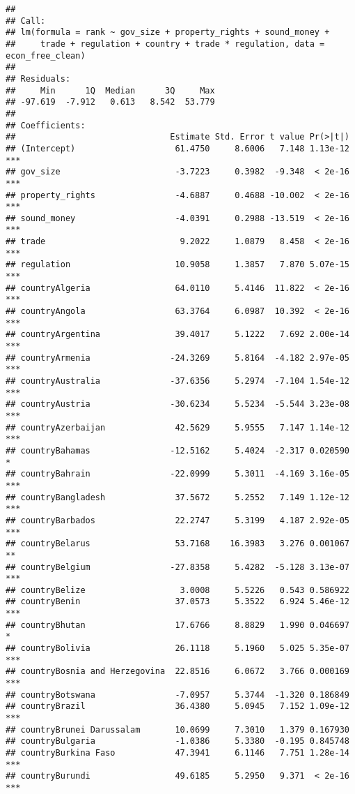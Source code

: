 \documentclass[
  11pt,
]{article}
\begin{document}
\begin{verbatim}
## 
## Call:
## lm(formula = rank ~ gov_size + property_rights + sound_money + 
##     trade + regulation + country + trade * regulation, data = econ_free_clean)
## 
## Residuals:
##     Min      1Q  Median      3Q     Max 
## -97.619  -7.912   0.613   8.542  53.779 
## 
## Coefficients:
##                               Estimate Std. Error t value Pr(>|t|)    
## (Intercept)                    61.4750     8.6006   7.148 1.13e-12 ***
## gov_size                       -3.7223     0.3982  -9.348  < 2e-16 ***
## property_rights                -4.6887     0.4688 -10.002  < 2e-16 ***
## sound_money                    -4.0391     0.2988 -13.519  < 2e-16 ***
## trade                           9.2022     1.0879   8.458  < 2e-16 ***
## regulation                     10.9058     1.3857   7.870 5.07e-15 ***
## countryAlgeria                 64.0110     5.4146  11.822  < 2e-16 ***
## countryAngola                  63.3764     6.0987  10.392  < 2e-16 ***
## countryArgentina               39.4017     5.1222   7.692 2.00e-14 ***
## countryArmenia                -24.3269     5.8164  -4.182 2.97e-05 ***
## countryAustralia              -37.6356     5.2974  -7.104 1.54e-12 ***
## countryAustria                -30.6234     5.5234  -5.544 3.23e-08 ***
## countryAzerbaijan              42.5629     5.9555   7.147 1.14e-12 ***
## countryBahamas                -12.5162     5.4024  -2.317 0.020590 *  
## countryBahrain                -22.0999     5.3011  -4.169 3.16e-05 ***
## countryBangladesh              37.5672     5.2552   7.149 1.12e-12 ***
## countryBarbados                22.2747     5.3199   4.187 2.92e-05 ***
## countryBelarus                 53.7168    16.3983   3.276 0.001067 ** 
## countryBelgium                -27.8358     5.4282  -5.128 3.13e-07 ***
## countryBelize                   3.0008     5.5226   0.543 0.586922    
## countryBenin                   37.0573     5.3522   6.924 5.46e-12 ***
## countryBhutan                  17.6766     8.8829   1.990 0.046697 *  
## countryBolivia                 26.1118     5.1960   5.025 5.35e-07 ***
## countryBosnia and Herzegovina  22.8516     6.0672   3.766 0.000169 ***
## countryBotswana                -7.0957     5.3744  -1.320 0.186849    
## countryBrazil                  36.4380     5.0945   7.152 1.09e-12 ***
## countryBrunei Darussalam       10.0699     7.3010   1.379 0.167930    
## countryBulgaria                -1.0386     5.3380  -0.195 0.845748    
## countryBurkina Faso            47.3941     6.1146   7.751 1.28e-14 ***
## countryBurundi                 49.6185     5.2950   9.371  < 2e-16 ***

\end{verbatim}
\end{document}
